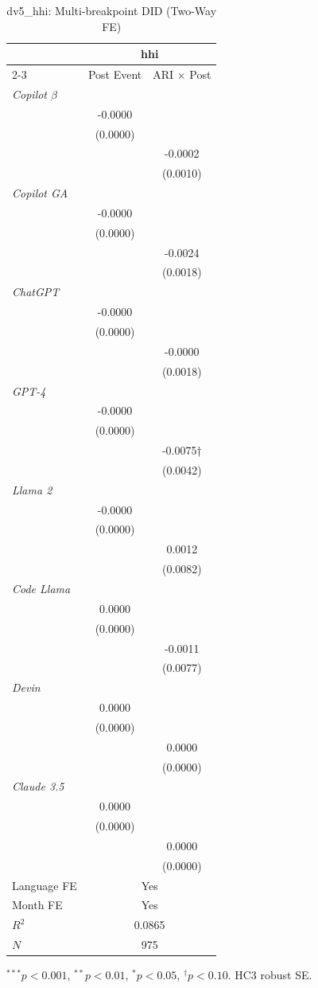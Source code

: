 \begin{table}[htbp]\centering
\caption{dv5_hhi: Multi-breakpoint DID (Two-Way FE)}
\begin{tabular}{lcc}
\toprule
 & \multicolumn{2}{c}{hhi} \\
\cmidrule(l){2-3}
 & Post Event & ARI $\times$ Post \\
\midrule
\textit{Copilot $\beta$} & & \\
 & -0.0000 & \\
 & (0.0000) & \\
 &  & -0.0002 \\
 &  & (0.0010) \\
\textit{Copilot GA} & & \\
 & -0.0000 & \\
 & (0.0000) & \\
 &  & -0.0024 \\
 &  & (0.0018) \\
\textit{ChatGPT} & & \\
 & -0.0000 & \\
 & (0.0000) & \\
 &  & -0.0000 \\
 &  & (0.0018) \\
\textit{GPT-4} & & \\
 & -0.0000 & \\
 & (0.0000) & \\
 &  & -0.0075† \\
 &  & (0.0042) \\
\textit{Llama 2} & & \\
 & -0.0000 & \\
 & (0.0000) & \\
 &  & 0.0012 \\
 &  & (0.0082) \\
\textit{Code Llama} & & \\
 & 0.0000 & \\
 & (0.0000) & \\
 &  & -0.0011 \\
 &  & (0.0077) \\
\textit{Devin} & & \\
 & 0.0000 & \\
 & (0.0000) & \\
 &  & 0.0000 \\
 &  & (0.0000) \\
\textit{Claude 3.5} & & \\
 & 0.0000 & \\
 & (0.0000) & \\
 &  & 0.0000 \\
 &  & (0.0000) \\
\midrule
Language FE & \multicolumn{2}{c}{Yes} \\
Month FE    & \multicolumn{2}{c}{Yes} \\
$R^2$ & \multicolumn{2}{c}{0.0865} \\
$N$   & \multicolumn{2}{c}{975} \\
\bottomrule
\end{tabular}
{\footnotesize $^{***}p<0.001$, $^{**}p<0.01$, $^{*}p<0.05$, $^{\dagger}p<0.10$. HC3 robust SE.}
\end{table}
